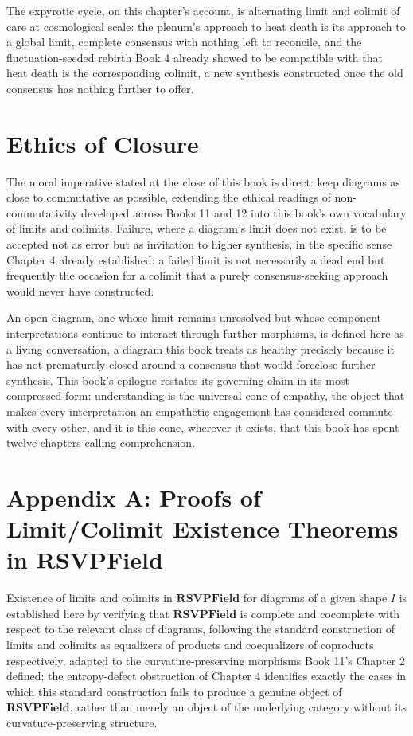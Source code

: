 The expyrotic cycle, on this chapter's account, is alternating limit and colimit of care at cosmological scale: the plenum's approach to heat death is its approach to a global limit, complete consensus with nothing left to reconcile, and the fluctuation-seeded rebirth Book 4 already showed to be compatible with that heat death is the corresponding colimit, a new synthesis constructed once the old consensus has nothing further to offer.

\chapter{Ethics of Closure}

The moral imperative stated at the close of this book is direct: keep diagrams as close to commutative as possible, extending the ethical readings of non-commutativity developed across Books 11 and 12 into this book's own vocabulary of limits and colimits. Failure, where a diagram's limit does not exist, is to be accepted not as error but as invitation to higher synthesis, in the specific sense Chapter 4 already established: a failed limit is not necessarily a dead end but frequently the occasion for a colimit that a purely consensus-seeking approach would never have constructed.

An open diagram, one whose limit remains unresolved but whose component interpretations continue to interact through further morphisms, is defined here as a living conversation, a diagram this book treats as healthy precisely because it has not prematurely closed around a consensus that would foreclose further synthesis. This book's epilogue restates its governing claim in its most compressed form: understanding is the universal cone of empathy, the object that makes every interpretation an empathetic engagement has considered commute with every other, and it is this cone, wherever it exists, that this book has spent twelve chapters calling comprehension.

\chapter*{Appendix A: Proofs of Limit/Colimit Existence Theorems in $\mathbf{RSVPField}$}

Existence of limits and colimits in $\mathbf{RSVPField}$ for diagrams of a given shape $I$ is established here by verifying that $\mathbf{RSVPField}$ is complete and cocomplete with respect to the relevant class of diagrams, following the standard construction of limits and colimits as equalizers of products and coequalizers of coproducts respectively, adapted to the curvature-preserving morphisms Book 11's Chapter 2 defined; the entropy-defect obstruction of Chapter 4 identifies exactly the cases in which this standard construction fails to produce a genuine object of $\mathbf{RSVPField}$, rather than merely an object of the underlying category without its curvature-preserving structure.

